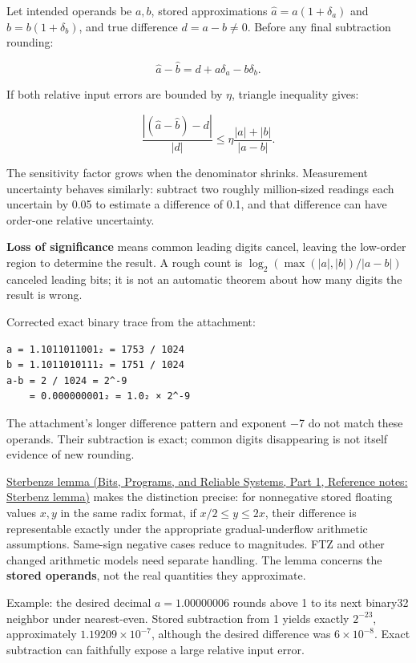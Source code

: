 Let intended operands be \(a,b\), stored approximations \(\widehat a=a(1+\delta_a)\) and \(\widehat b=b(1+\delta_b)\), and true difference \(d=a-b\ne0\). Before any final subtraction rounding:

\[
\widehat a-\widehat b=d+a\delta_a-b\delta_b.
\]

If both relative input errors are bounded by \(\eta\), triangle inequality gives:

\[
\frac{|(\widehat a-\widehat b)-d|}{|d|}
\le\eta\frac{|a|+|b|}{|a-b|}.
\]

The sensitivity factor grows when the denominator shrinks. Measurement uncertainty behaves similarly: subtract two roughly million-sized readings each uncertain by 0.05 to estimate a difference of 0.1, and that difference can have order-one relative uncertainty.

\textbf{Loss of significance} means common leading digits cancel, leaving the low-order region to determine the result. A rough count is \(\log_2(\max(|a|,|b|)/|a-b|)\) canceled leading bits; it is not an automatic theorem about how many digits the result is wrong.

Corrected exact binary trace from the attachment:

\begin{verbatim}
a = 1.1011011001₂ = 1753 / 1024
b = 1.1011010111₂ = 1751 / 1024
a-b = 2 / 1024 = 2^-9
    = 0.000000001₂ = 1.0₂ × 2^-9
\end{verbatim}

The attachment's longer difference pattern and exponent −7 do not match these operands. Their subtraction is exact; common digits disappearing is not itself evidence of new rounding.

\href{../01-Bits-Programs-and-Reliable-Systems-P01/main.pdf\#appendix-399b7ad53f39}{Sterbenz\textquotesingle s lemma (Bits, Programs, and Reliable Systems, Part 1, Reference notes: Sterbenz lemma)} makes the distinction precise: for nonnegative stored floating values \(x,y\) in the same radix format, if \(x/2\le y\le2x\), their difference is representable exactly under the appropriate gradual-underflow arithmetic assumptions. Same-sign negative cases reduce to magnitudes. FTZ and other changed arithmetic models need separate handling. The lemma concerns the \textbf{stored operands}, not the real quantities they approximate.

Example: the desired decimal \(a=1.00000006\) rounds above 1 to its next binary32 neighbor under nearest-even. Stored subtraction from 1 yields exactly \(2^{-23}\), approximately \(1.19209\times10^{-7}\), although the desired difference was \(6\times10^{-8}\). Exact subtraction can faithfully expose a large relative input error.

